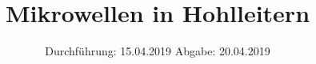 

\subject{V53}
\title{Mikrowellen in Hohlleitern}
\date{%
  Durchführung: 15.04.2019
  \hspace{3em}
  Abgabe: 20.04.2019
}



\maketitle
\thispagestyle{empty}
\tableofcontents
\newpage






\printbibliography{}


